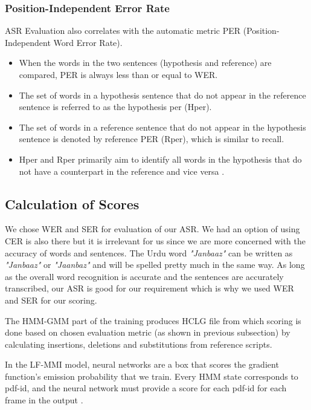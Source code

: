 \subsubsection{Position-Independent Error Rate} 
ASR Evaluation also correlates with the automatic metric PER (Position-Independent Word Error Rate). 
    \begin{itemize}
        \item When the words in the two sentences (hypothesis and reference) are compared, PER is always less than or equal to WER. 
        \item The set of words in a hypothesis sentence that do not appear in the reference sentence is referred to as the hypothesis per (Hper). 
        \item The set of words in a reference sentence that do not appear in the hypothesis sentence is denoted by reference PER (Rper), which is similar to recall. 
        \item Hper and Rper primarily aim to identify all words in the hypothesis that do not have a counterpart in the reference and vice versa \cite{maglogiannis__2020}.
    \end{itemize}
    
\subsection{Calculation of Scores}

We chose WER and SER for evaluation of our ASR. We had an option of using CER is also there but it is irrelevant for us since we are more concerned with the accuracy of words and sentences. The Urdu word \textit{"Janbaaz"} can be written as \textit{"Janbaaz"} or \textit{"Jaanbaz"} and will be spelled pretty much in the same way. As long as the overall word recognition is accurate and the sentences are accurately transcribed, our ASR is good for our requirement which is why we used WER and SER for our scoring.

The HMM-GMM part of the training produces HCLG file from which scoring is done based on chosen evaluation metric (as shown in previous subsection) by calculating insertions, deletions and substitutions from reference scripts.  

In the LF-MMI model, neural networks are a box that scores the gradient function's emission probability that we train. Every HMM state corresponds to pdf-id, and the neural network must provide a score for each pdf-id for each frame in the output \cite{ghahremani_investigation_2017}. 

